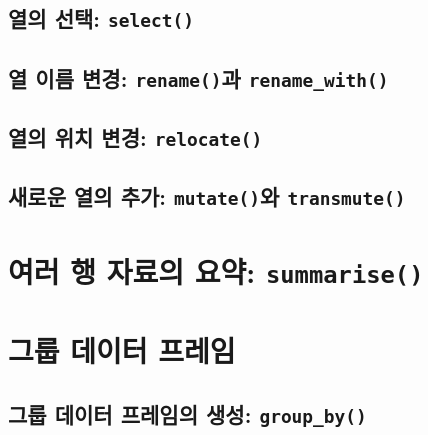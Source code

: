 \documentclass[
]{book}
\begin{document}
\hypertarget{uxc5f4uxc758-uxc120uxd0dd-select}{%
\subsection{\texorpdfstring{열의 선택: \texttt{select()}}{열의 선택: select()}}\label{uxc5f4uxc758-uxc120uxd0dd-select}}

\hypertarget{uxc5f4-uxc774uxb984-uxbcc0uxacbd-renameuxacfc-rename_with}{%
\subsection{\texorpdfstring{열 이름 변경: \texttt{rename()}과 \texttt{rename\_with()}}{열 이름 변경: rename()과 rename\_with()}}\label{uxc5f4-uxc774uxb984-uxbcc0uxacbd-renameuxacfc-rename_with}}

\hypertarget{uxc5f4uxc758-uxc704uxce58-uxbcc0uxacbd-relocate}{%
\subsection{\texorpdfstring{열의 위치 변경: \texttt{relocate()}}{열의 위치 변경: relocate()}}\label{uxc5f4uxc758-uxc704uxce58-uxbcc0uxacbd-relocate}}

\hypertarget{uxc0c8uxb85cuxc6b4-uxc5f4uxc758-uxcd94uxac00-mutateuxc640-transmute}{%
\subsection{\texorpdfstring{새로운 열의 추가: \texttt{mutate()}와 \texttt{transmute()}}{새로운 열의 추가: mutate()와 transmute()}}\label{uxc0c8uxb85cuxc6b4-uxc5f4uxc758-uxcd94uxac00-mutateuxc640-transmute}}

\hypertarget{uxc5ecuxb7ec-uxd589-uxc790uxb8ccuxc758-uxc694uxc57d-summarise}{%
\section{\texorpdfstring{여러 행 자료의 요약: \texttt{summarise()}}{여러 행 자료의 요약: summarise()}}\label{uxc5ecuxb7ec-uxd589-uxc790uxb8ccuxc758-uxc694uxc57d-summarise}}

\hypertarget{uxadf8uxb8f9-uxb370uxc774uxd130-uxd504uxb808uxc784}{%
\section{그룹 데이터 프레임}\label{uxadf8uxb8f9-uxb370uxc774uxd130-uxd504uxb808uxc784}}

\hypertarget{uxadf8uxb8f9-uxb370uxc774uxd130-uxd504uxb808uxc784uxc758-uxc0dduxc131-group_by}{%
\subsection{\texorpdfstring{그룹 데이터 프레임의 생성: \texttt{group\_by()}}{그룹 데이터 프레임의 생성: group\_by()}}\label{uxadf8uxb8f9-uxb370uxc774uxd130-uxd504uxb808uxc784uxc758-uxc0dduxc131-group_by}}
\end{document}
